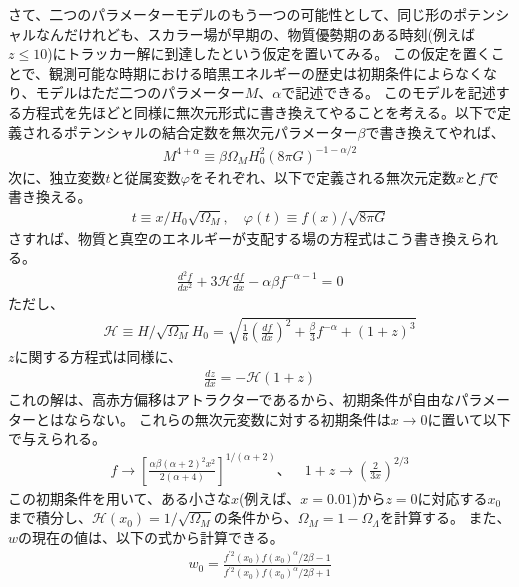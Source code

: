 \documentclass[11pt]{ltjsarticle}
\theoremstyle{plain}
\theoremstyle{break}
\begin{document}
さて、二つのパラメーターモデルのもう一つの可能性として、同じ形のポテンシャルなんだけれども、スカラー場が早期の、物質優勢期のある時刻(例えば$z \leq 10$)にトラッカー解に到達したという仮定を置いてみる。
この仮定を置くことで、観測可能な時期における暗黒エネルギーの歴史は初期条件によらなくなり、モデルはただ二つのパラメーター$M、\alpha$で記述できる。
このモデルを記述する方程式を先ほどと同様に無次元形式に書き換えてやることを考える。以下で定義されるポテンシャルの結合定数を無次元パラメーター$\beta$で書き換えてやれば、
\begin{align}
  M^{4+\alpha} \equiv \beta \Omega_{M} H_{0}^{2}(8 \pi G)^{-1-\alpha / 2}
\end{align}%
次に、独立変数$t$と従属変数$\varphi$をそれぞれ、以下で定義される無次元定数$x$と$f$で書き換える。
\begin{align}
  t \equiv x / H_{0} \sqrt{\Omega_{M}}, \quad \varphi(t) \equiv f(x) / \sqrt{8 \pi G}
\end{align}%
さすれば、物質と真空のエネルギーが支配する場の方程式はこう書き換えられる。
\begin{align}
  \frac{d^{2} f}{d x^{2}}+3 \mathcal{H} \frac{d f}{d x}-\alpha \beta f^{-\alpha-1}=0
\end{align}%
ただし、
\begin{align}
  \mathcal{H} \equiv H / \sqrt{\Omega_{M}} H_{0}=\sqrt{\frac{1}{6}\left(\frac{d f}{d x}\right)^{2}+\frac{\beta}{3} f^{-\alpha}+(1+z)^{3}}
\end{align}%
$z$に関する方程式は同様に、
\begin{align}
  \frac{d z}{d x}=-\mathcal{H}(1+z)
\end{align}%
これの解は、高赤方偏移はアトラクターであるから、初期条件が自由なパラメーターとはならない。
これらの無次元変数に対する初期条件は$x \to 0$に置いて以下で与えられる。
\begin{align}
  f \rightarrow\left[\frac{\alpha \beta(\alpha+2)^{2} x^{2}}{2(\alpha+4)}\right]^{1 /(\alpha+2)}、\quad 
  1+z \rightarrow\left(\frac{2}{3 x}\right)^{2 / 3}
\end{align}%
この初期条件を用いて、ある小さな$x$(例えば、$x = 0.01$)から$z=0$に対応する$x_0$まで積分し、$\mathcal{H} ( x_0) = 1/\sqrt{\Omega_M}$の条件から、$\Omega_M = 1- \Omega_{\Lambda}$を計算する。
また、$w$の現在の値は、以下の式から計算できる。
\begin{align}
  w_{0}=\frac{f^{\prime 2}\left(x_{0}\right) f\left(x_{0}\right)^{\alpha} / 2 \beta-1}{f^{\prime 2}\left(x_{0}\right) f\left(x_{0}\right)^{\alpha} / 2 \beta+1}
\end{align}%
\end{document}
